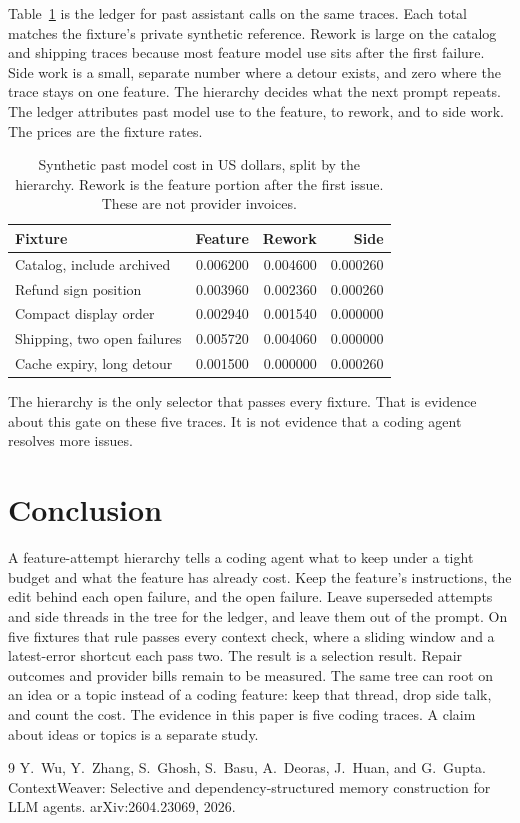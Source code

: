 \documentclass[11pt]{article}
\begin{document}
Table~\ref{tab:cost} is the ledger for past assistant calls on the same traces.
Each total matches the fixture's private synthetic reference.
Rework is large on the catalog and shipping traces because most feature model use sits after the first failure.
Side work is a small, separate number where a detour exists, and zero where the trace stays on one feature.
The hierarchy decides what the next prompt repeats.
The ledger attributes past model use to the feature, to rework, and to side work.
The prices are the fixture rates.

\begin{table}[t]
\centering
\caption{Synthetic past model cost in US dollars, split by the hierarchy.
Rework is the feature portion after the first issue.
These are not provider invoices.}
\label{tab:cost}
\small
\begin{tabular}{@{}lrrr@{}}
\toprule
Fixture & Feature & Rework & Side \\
\midrule
Catalog, include archived & 0.006200 & 0.004600 & 0.000260 \\
Refund sign position & 0.003960 & 0.002360 & 0.000260 \\
Compact display order & 0.002940 & 0.001540 & 0.000000 \\
Shipping, two open failures & 0.005720 & 0.004060 & 0.000000 \\
Cache expiry, long detour & 0.001500 & 0.000000 & 0.000260 \\
\bottomrule
\end{tabular}
\end{table}

The hierarchy is the only selector that passes every fixture.
That is evidence about this gate on these five traces.
It is not evidence that a coding agent resolves more issues.

\section{Conclusion}

A feature-attempt hierarchy tells a coding agent what to keep under a tight budget and what the feature has already cost.
Keep the feature's instructions, the edit behind each open failure, and the open failure.
Leave superseded attempts and side threads in the tree for the ledger, and leave them out of the prompt.
On five fixtures that rule passes every context check, where a sliding window and a latest-error shortcut each pass two.
The result is a selection result.
Repair outcomes and provider bills remain to be measured.
The same tree can root on an idea or a topic instead of a coding feature: keep that thread, drop side talk, and count the cost.
The evidence in this paper is five coding traces.
A claim about ideas or topics is a separate study.

\begin{thebibliography}{9}
Y.~Wu, Y.~Zhang, S.~Ghosh, S.~Basu, A.~Deoras, J.~Huan, and G.~Gupta.
ContextWeaver: Selective and dependency-structured memory construction for LLM agents.
arXiv:2604.23069, 2026.
\end{thebibliography}
\end{document}
